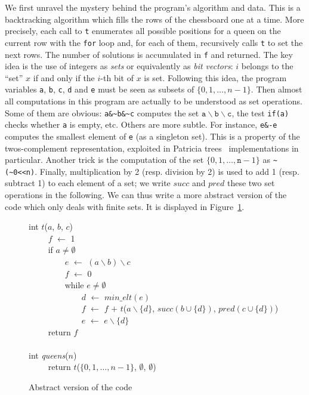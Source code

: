 \documentclass[a4paper]{llncs}
\newcommand{\kw}[1]{\textsf{#1}}
\newcommand{\minelt}[1]{\ensuremath{\mathit{min\_elt}(#1)}}
\begin{document}
We first unravel the mystery behind the program's algorithm and data.
This is a backtracking algorithm
which fills the rows of the chessboard one at a time.
More precisely, each call to \texttt{t} enumerates all possible
positions for a queen on the current row with the \texttt{for} loop
and, for each of them, recursively calls \texttt{t} to set the next
rows.  The number of solutions is accumulated in \texttt{f} and
returned.  The key idea is the use of integers as \emph{sets} or
equivalently as \emph{bit vectors}: $i$ belongs to the ``set'' $x$ if and
only if the $i$-th bit of $x$ is set.
Following this idea, the program variables
\texttt{a}, \texttt{b}, \texttt{c}, \texttt{d} and \texttt{e} must
be seen as subsets of $\{0,1,\dots,n-1\}$.
Then almost all computations in this program are actually to be
understood as set operations. Some of them are obvious: \verb!a&~b&~c!
computes the set $\mathtt{a}\backslash\mathtt{b}\backslash\mathtt{c}$,
the test \verb!if(a)! checks whether \texttt{a} is empty, etc. Others
are more subtle. For instance, \verb!e&-e! computes the smallest
element of \texttt{e} (as a singleton set). This is a 
property of the twos-complement representation, exploited in
Patricia trees~\cite{patricia} implementations in particular.
Another trick is the computation of the set
$\{0,1,\dots,\mathtt{n}-1\}$ as \verb!~(~0<<n)!. Finally,
multiplication by 2 (resp. division by 2) is used to add 1 (resp.
subtract 1) to each element of a set; we write $\mathit{succ}$ and
$\mathit{pred}$ these two 
set operations in the following. We can thus write a more
abstract version of the code which only deals with finite sets. It is
displayed in Figure~\ref{fig:abstract}.

\begin{figure}[t]
  \hrulefill\vspace{-0.2em}
{\begin{obeylines}
  \kw{int} $t$($a$, $b$, $c$) 
  ~~~~ $f$ $\leftarrow$ 1
  ~~~~ \kw{if} $a \not= \emptyset$ 
  ~~~~~~~~ $e$ $\leftarrow$ $(a \backslash  b) \backslash c$ 
  ~~~~~~~~ $f$ $\leftarrow$ 0 
  ~~~~~~~~ \kw{while} $e \not=\emptyset$ 
  ~~~~~~~~~~~~ $d$ $\leftarrow$ $\minelt{e}$ 
  ~~~~~~~~~~~~ $f$ $\leftarrow$ $f$ $+$ $t$($a\backslash \{d\}$, $\mathit{succ}(b\cup\{d\})$, $\mathit{pred}(c\cup\{d\})$) 
  ~~~~~~~~~~~~ $e$ $\leftarrow$ $e \backslash  \{d\}$ 
  ~~~~ \kw{return} $f$ 
  ~~~~ 
  \kw{int} \textit{queens}($n$) 
  ~~~~ \kw{return} $t$($\{0,1,\dots,n-1\}$, $\emptyset$, $\emptyset$)
\end{obeylines}}
\vspace{-0.6em}\hrulefill\vspace{-1em}
  \caption{Abstract version of the code}
  \label{fig:abstract}
\end{figure}
\end{document}
